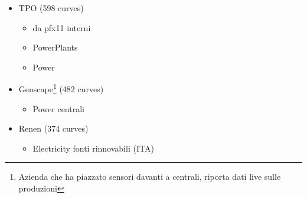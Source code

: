 \begin{itemize}
\begin{itemize}
            \item Gas
                \begin{itemize}
                    \item Stoccaggio
                    \item Esportazioni
                    \item immesso
                    \item riconsegnato
                    \item roba sul bilanciamento
                \end{itemize}
            \item Temperature
                \begin{itemize}
                    \item temperature rilevate (massima e minima per citta`)
                \end{itemize}
            \item GNL\footnote{Liquefied Natural Gas}
                \begin{itemize}
                    \item scaricato
                    \item immesso
                    \item allocato
                    \item stoccaggio
                    \item 
                \end{itemize}
            \item Trasporti su gas, gnl
        \end{itemize}
    \item TPO (598 curves)
        \begin{itemize}
            \item da pfx11 interni
            \item PowerPlants
            \item Power
        \end{itemize}
    \item Genscape\footnote{Azienda che ha piazzato sensori davanti a centrali, riporta dati live sulle produzioni} (482 curves)
        \begin{itemize}
            \item Power centrali
        \end{itemize}
    \item Renen (374 curves)
        \begin{itemize}
            \item Electricity fonti rinnovabili (ITA)

\end{itemize}
\end{itemize}
